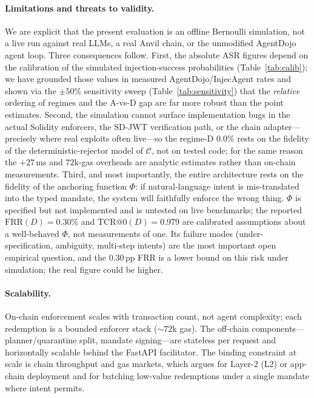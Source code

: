 \documentclass[10pt,twocolumn,letterpaper]{article}
\begin{document}
\paragraph{Limitations and threats to validity.} We are explicit that the present evaluation is an offline Bernoulli simulation, not a live run against real LLMs, a real Anvil chain, or the unmodified AgentDojo agent loop. Three consequences follow. First, the absolute ASR figures depend on the calibration of the simulated injection-success probabilities (Table~\ref{tab:calib}); we have grounded those values in measured AgentDojo/InjecAgent rates and shown via the $\pm50\%$ sensitivity sweep (Table~\ref{tab:sensitivity}) that the \emph{relative} ordering of regimes and the A-vs-D gap are far more robust than the point estimates. Second, the simulation cannot surface implementation bugs in the actual Solidity enforcers, the SD-JWT verification path, or the chain adapter---precisely where real exploits often live---so the regime-D $0.0\%$ rests on the fidelity of the deterministic-rejector model of $\mathcal{C}$, not on tested code; for the same reason the $+27$\,ms and $72$k-gas overheads are analytic estimates rather than on-chain measurements. Third, and most importantly, the entire architecture rests on the fidelity of the anchoring function $\Phi$: if natural-language intent is mis-translated into the typed mandate, the system will faithfully enforce the wrong thing. $\Phi$ is specified but not implemented and is untested on live benchmarks; the reported $\mathrm{FRR}(D)=0.30\%$ and $\mathrm{TCR@0}(D)=0.979$ are calibrated assumptions about a well-behaved $\Phi$, not measurements of one. Its failure modes (under-specification, ambiguity, multi-step intents) are the most important open empirical question, and the $0.30$\,pp FRR is a lower bound on this risk under simulation; the real figure could be higher.

\paragraph{Scalability.} On-chain enforcement scales with transaction count, not agent complexity; each redemption is a bounded enforcer stack ($\sim$$72$k gas). The off-chain components---planner/quarantine split, mandate signing---are stateless per request and horizontally scalable behind the FastAPI facilitator. The binding constraint at scale is chain throughput and gas markets, which argues for Layer-2 (L2) or app-chain deployment and for batching low-value redemptions under a single mandate where intent permits.
\end{document}

